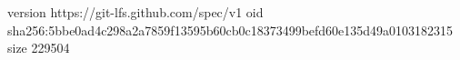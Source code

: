 version https://git-lfs.github.com/spec/v1
oid sha256:5bbe0ad4c298a2a7859f13595b60cb0c18373499befd60e135d49a0103182315
size 229504
